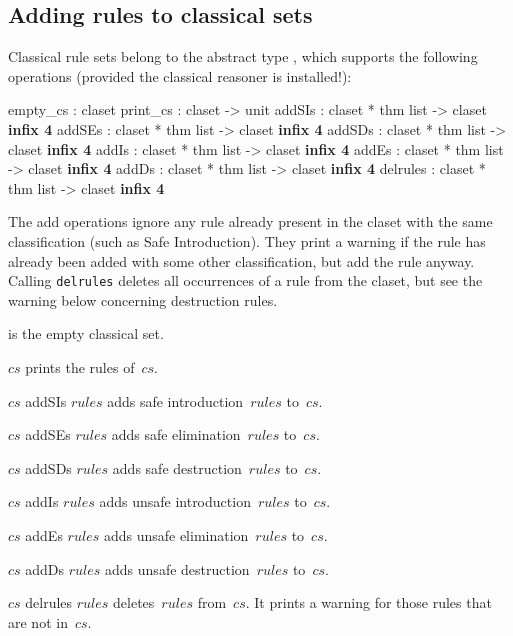 \subsection{Adding rules to classical sets}
Classical rule sets belong to the abstract type , which
supports the following operations (provided the classical reasoner is
installed!):
\begin{ttbox} 
empty_cs    : claset
print_cs    : claset -> unit
addSIs      : claset * thm list -> claset                 \hfill{\bf infix 4}
addSEs      : claset * thm list -> claset                 \hfill{\bf infix 4}
addSDs      : claset * thm list -> claset                 \hfill{\bf infix 4}
addIs       : claset * thm list -> claset                 \hfill{\bf infix 4}
addEs       : claset * thm list -> claset                 \hfill{\bf infix 4}
addDs       : claset * thm list -> claset                 \hfill{\bf infix 4}
delrules    : claset * thm list -> claset                 \hfill{\bf infix 4}
\end{ttbox}
The add operations ignore any rule already present in the claset with the same
classification (such as Safe Introduction).  They print a warning if the rule
has already been added with some other classification, but add the rule
anyway.  Calling {\tt delrules} deletes all occurrences of a rule from the
claset, but see the warning below concerning destruction rules.
\begin{ttdescription}
\item[\ttindexbold{empty_cs}] is the empty classical set.

\item[\ttindexbold{print_cs} $cs$] prints the rules of~$cs$.

\item[$cs$ addSIs $rules$] 
adds safe introduction~$rules$ to~$cs$.

\item[$cs$ addSEs $rules$] 
adds safe elimination~$rules$ to~$cs$.

\item[$cs$ addSDs $rules$] 
adds safe destruction~$rules$ to~$cs$.

\item[$cs$ addIs $rules$] 
adds unsafe introduction~$rules$ to~$cs$.

\item[$cs$ addEs $rules$] 
adds unsafe elimination~$rules$ to~$cs$.

\item[$cs$ addDs $rules$] 
adds unsafe destruction~$rules$ to~$cs$.

\item[$cs$ delrules $rules$] 
deletes~$rules$ from~$cs$.  It prints a warning for those rules that are not
in~$cs$.
\end{ttdescription}

